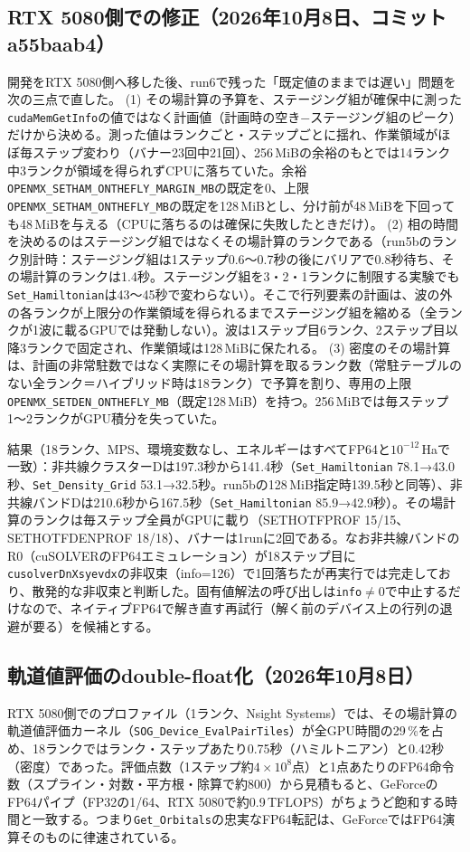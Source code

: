 \documentclass[a4paper,11pt]{ltjsarticle}
\newcommand{\code}[1]{\texttt{#1}}
\begin{document}
\subsection{RTX 5080側での修正（2026年10月8日、コミットa55baab4）}
開発をRTX 5080側へ移した後、run6で残った「既定値のままでは遅い」問題を次の三点で直した。
(1) その場計算の予算を、ステージング組が確保中に測った\code{cudaMemGetInfo}の値ではなく計画値（計画時の空き$-$ステージング組のピーク）だけから決める。測った値はランクごと・ステップごとに揺れ、作業領域がほぼ毎ステップ変わり（バナー23回中21回）、256\,MiBの余裕のもとでは14ランク中3ランクが領域を得られずCPUに落ちていた。余裕\code{OPENMX\_SETHAM\_ONTHEFLY\_MARGIN\_MB}の既定を0、上限\code{OPENMX\_SETHAM\_ONTHEFLY\_MB}の既定を128\,MiBとし、分け前が48\,MiBを下回っても48\,MiBを与える（CPUに落ちるのは確保に失敗したときだけ）。
(2) 相の時間を決めるのはステージング組ではなくその場計算のランクである（run5bのランク別計時：ステージング組は1ステップ0.6〜0.7秒の後にバリアで0.8秒待ち、その場計算のランクは1.4秒。ステージング組を3・2・1ランクに制限する実験でも\code{Set\_Hamiltonian}は43〜45秒で変わらない）。そこで行列要素の計画は、波の外の各ランクが上限分の作業領域を得られるまでステージング組を縮める（全ランクが1波に載るGPUでは発動しない）。波は1ステップ目6ランク、2ステップ目以降3ランクで固定され、作業領域は128\,MiBに保たれる。
(3) 密度のその場計算は、計画の非常駐数ではなく実際にその場計算を取るランク数（常駐テーブルのない全ランク＝ハイブリッド時は18ランク）で予算を割り、専用の上限\code{OPENMX\_SETDEN\_ONTHEFLY\_MB}（既定128\,MiB）を持つ。256\,MiBでは毎ステップ1〜2ランクがGPU積分を失っていた。

結果（18ランク、MPS、環境変数なし、エネルギーはすべてFP64と$10^{-12}$\,Haで一致）：非共線クラスターDは197.3秒から141.4秒（\code{Set\_Hamiltonian} 78.1→43.0秒、\code{Set\_Density\_Grid} 53.1→32.5秒。run5bの128\,MiB指定時139.5秒と同等）、非共線バンドDは210.6秒から167.5秒（\code{Set\_Hamiltonian} 85.9→42.9秒）。その場計算のランクは毎ステップ全員がGPUに載り（SETHOTFPROF 15/15、SETHOTFDENPROF 18/18）、バナーは1runに2回である。なお非共線バンドのR0（cuSOLVERのFP64エミュレーション）が18ステップ目に\code{cusolverDnXsyevdx}の非収束（info=126）で1回落ちたが再実行では完走しており、散発的な非収束と判断した。固有値解法の呼び出しは\code{info}$\ne0$で中止するだけなので、ネイティブFP64で解き直す再試行（解く前のデバイス上の行列の退避が要る）を候補とする。

\subsection{軌道値評価のdouble-float化（2026年10月8日）}
RTX 5080側でのプロファイル（1ランク、Nsight Systems）では、その場計算の軌道値評価カーネル（\code{SOG\_Device\_EvalPairTiles}）が全GPU時間の29\,\%を占め、18ランクではランク・ステップあたり0.75秒（ハミルトニアン）と0.42秒（密度）であった。評価点数（1ステップ約$4\times10^8$点）と1点あたりのFP64命令数（スプライン・対数・平方根・除算で約800）から見積もると、GeForceのFP64パイプ（FP32の1/64、RTX 5080で約0.9\,TFLOPS）がちょうど飽和する時間と一致する。つまり\code{Get\_Orbitals}の忠実なFP64転記は、GeForceではFP64演算そのものに律速されている。
\end{document}
